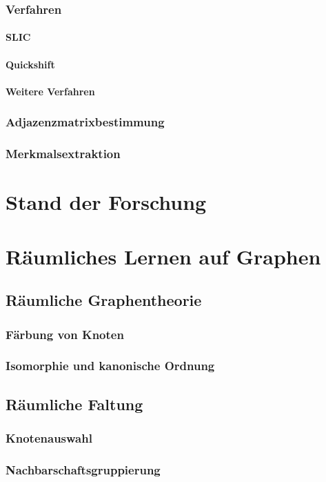 \subsection{Verfahren}
\subsubsection{SLIC}
\subsubsection{Quickshift}
\subsubsection{Weitere Verfahren}
\subsection{Adjazenzmatrixbestimmung}
\subsection{Merkmalsextraktion}

\chapter{Stand der Forschung}

\chapter{Räumliches Lernen auf Graphen}
\section{Räumliche Graphentheorie}
\subsection{Färbung von Knoten}
\subsection{Isomorphie und kanonische Ordnung}
\section{Räumliche Faltung}
\subsection{Knotenauswahl}
\subsection{Nachbarschaftsgruppierung}
